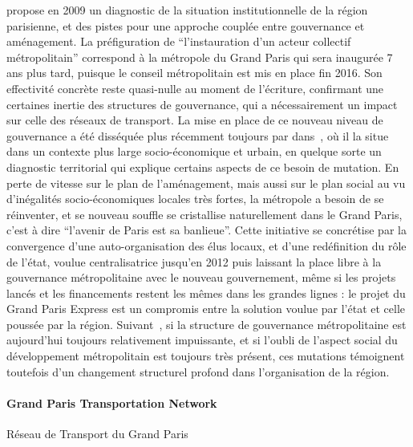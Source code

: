 \cite{gilli2009paris} propose en 2009 un diagnostic de la situation institutionnelle de la région parisienne, et des pistes pour une approche couplée entre gouvernance et aménagement. La préfiguration de ``l'instauration d'un acteur collectif métropolitain'' correspond à la métropole du Grand Paris qui sera inaugurée 7 ans plus tard, puisque le conseil métropolitain est mis en place fin 2016. Son effectivité concrète reste quasi-nulle au moment de l'écriture, confirmant une certaines inertie des structures de gouvernance, qui a nécessairement un impact sur celle des réseaux de transport. La mise en place de ce nouveau niveau de gouvernance a été disséquée plus récemment toujours par  dans~\cite{gilli2014gouverner}, où il la situe dans un contexte plus large socio-économique et urbain, en quelque sorte un diagnostic territorial qui explique certains aspects de ce besoin de mutation. En perte de vitesse sur le plan de l'aménagement, mais aussi sur le plan social au vu d'inégalités socio-économiques locales très fortes, la métropole a besoin de se réinventer, et se nouveau souffle se cristallise naturellement dans le Grand Paris, c'est à dire ``l'avenir de Paris est sa banlieue''. Cette initiative se concrétise par la convergence d'une auto-organisation des élus locaux, et d'une redéfinition du rôle de l'état, voulue centralisatrice jusqu'en 2012 puis laissant la place libre à la gouvernance métropolitaine avec le nouveau gouvernement, même si les projets lancés et les financements restent les mêmes dans les grandes lignes : le projet du Grand Paris Express est un compromis entre la solution voulue par l'état et celle poussée par la région. Suivant~\cite{desjardins2016grand}, si la structure de gouvernance métropolitaine est aujourd'hui toujours relativement impuissante, et si l'oubli de l'aspect social du développement métropolitain est toujours très présent, ces mutations témoignent toutefois d'un changement structurel profond dans l'organisation de la région.




\paragraph{Grand Paris Transportation Network}{Réseau de Transport du Grand Paris}

